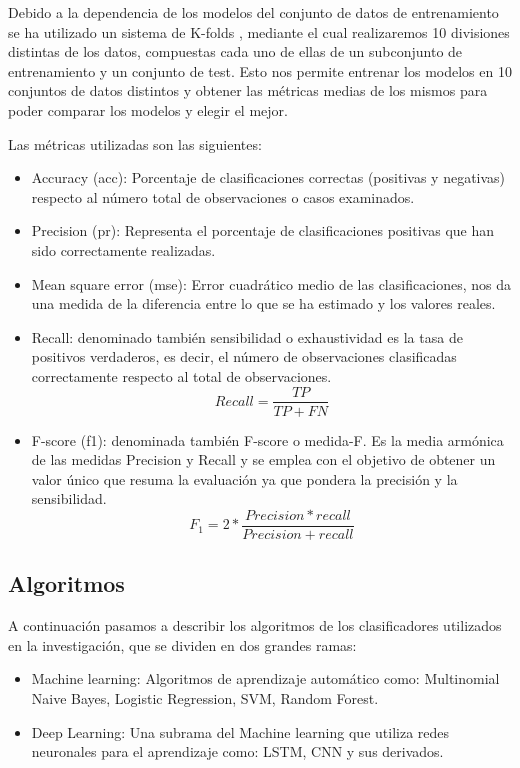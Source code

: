Debido a la dependencia de los modelos del conjunto de datos de entrenamiento se ha utilizado un sistema de K-folds \cite{kfold}, mediante el cual realizaremos 10 divisiones distintas de los datos, compuestas cada uno de ellas de un subconjunto de entrenamiento y un conjunto de test. Esto nos permite entrenar los modelos en 10 conjuntos de datos distintos y obtener las métricas medias de los mismos para poder comparar los modelos y elegir el mejor.

Las métricas utilizadas son las siguientes:

\begin{itemize}
\item Accuracy (acc): Porcentaje de clasificaciones correctas (positivas y negativas) respecto al número total de observaciones o casos examinados.
\item Precision (pr): Representa el porcentaje de clasificaciones positivas que han sido correctamente realizadas.
\item Mean square error (mse): Error cuadrático medio de las clasificaciones, nos da una medida de la diferencia entre lo que se ha estimado y los valores reales.
\item Recall: denominado también sensibilidad o exhaustividad es la tasa de positivos verdaderos, es decir, el número de observaciones clasificadas correctamente respecto al total de observaciones.
\begin{equation}
	Recall = \frac{TP}{TP + FN}
\end{equation}
\item F-score (f1): denominada también F-score o medida-F. Es la media armónica de las medidas Precision y Recall y se emplea con el objetivo de obtener un valor único que resuma la evaluación ya que pondera la precisión y la sensibilidad.
\begin{equation}
	F_{1} = 2 * \frac{Precision * recall}{Precision + recall}
\end{equation}
\end{itemize} 


\subsection{Algoritmos}\label{alg}

A continuación pasamos a describir los algoritmos de los clasificadores utilizados en la investigación, que se dividen en dos grandes ramas:

\begin{itemize}
	\item Machine learning: Algoritmos de aprendizaje automático como: Multinomial Naive Bayes, Logistic Regression, SVM, Random Forest.
	\item Deep Learning: Una subrama del Machine learning que utiliza redes neuronales para el aprendizaje como: LSTM, CNN y sus derivados.
\end{itemize}



